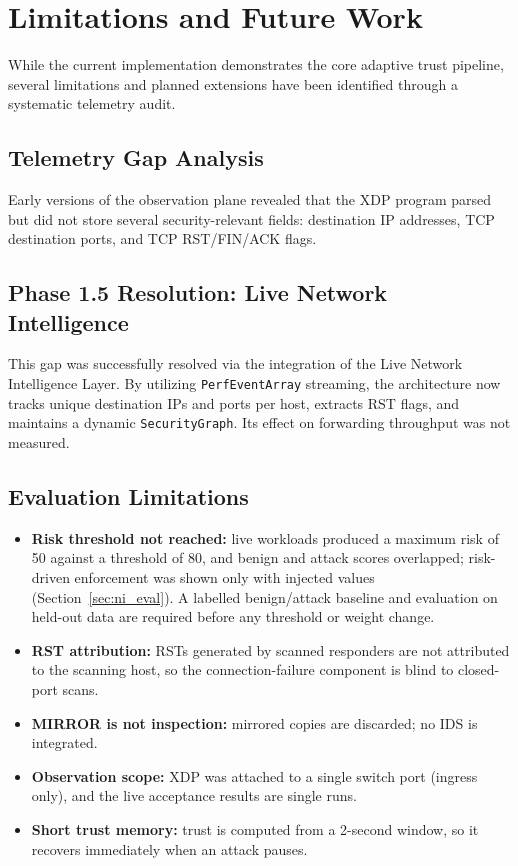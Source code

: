 \documentclass[conference]{IEEEtran}
\begin{document}

\section{Limitations and Future Work}

While the current implementation demonstrates the core adaptive trust pipeline, several limitations and planned extensions have been identified through a systematic telemetry audit.

\subsection{Telemetry Gap Analysis}
Early versions of the observation plane revealed that the XDP program parsed but did not store several security-relevant fields: destination IP addresses, TCP destination ports, and TCP RST/FIN/ACK flags. 

\subsection{Phase 1.5 Resolution: Live Network Intelligence}
This gap was successfully resolved via the integration of the Live Network Intelligence Layer. By utilizing \texttt{PerfEventArray} streaming, the architecture now tracks unique destination IPs and ports per host, extracts RST flags, and maintains a dynamic \texttt{SecurityGraph}. Its effect on forwarding throughput was not measured.

\subsection{Evaluation Limitations}
\begin{itemize}
\item \textbf{Risk threshold not reached:} live workloads produced a maximum risk of 50 against a threshold of 80, and benign and attack scores overlapped; risk-driven enforcement was shown only with injected values (Section~\ref{sec:ni_eval}). A labelled benign/attack baseline and evaluation on held-out data are required before any threshold or weight change.
\item \textbf{RST attribution:} RSTs generated by scanned responders are not attributed to the scanning host, so the connection-failure component is blind to closed-port scans.
\item \textbf{MIRROR is not inspection:} mirrored copies are discarded; no IDS is integrated.
\item \textbf{Observation scope:} XDP was attached to a single switch port (ingress only), and the live acceptance results are single runs.
\item \textbf{Short trust memory:} trust is computed from a 2-second window, so it recovers immediately when an attack pauses.
\end{itemize}
\end{document}
